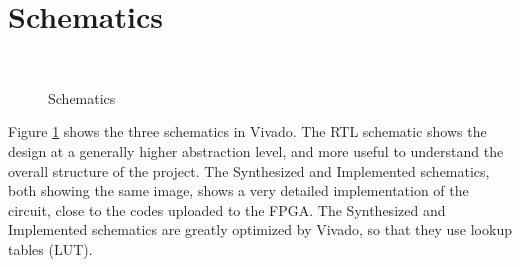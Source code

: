 \documentclass[a4paper, 12pt]{article}
\begin{document}
\section{Schematics}

\begin{figure}[!h]
	\centering
	\\                        
	\hfill
	\caption{Schematics}
	\label{fig:schs}
\end{figure}

Figure \ref{fig:schs} shows the three schematics in Vivado.
The RTL schematic shows the design at a generally higher abstraction level, and more useful to understand the overall structure of the project.
The Synthesized and Implemented schematics, both showing the same image, shows a very detailed implementation of the circuit, close to the codes uploaded to the FPGA.
The Synthesized and Implemented schematics are greatly optimized by Vivado, so that they use lookup tables (LUT).
\end{document}
